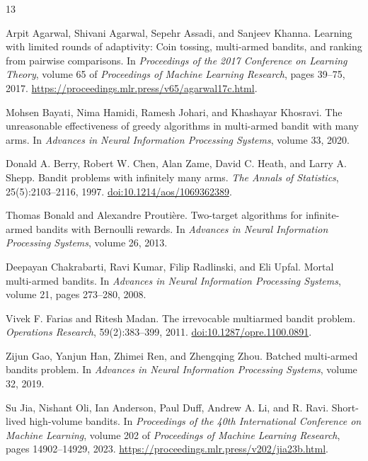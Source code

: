\documentclass[11pt,letterpaper]{article}
\numberwithin{equation}{section}
\theoremstyle{definition}
\theoremstyle{remark}
\newcommand{\1}{\mathbf{1}}
\begin{document}
\begin{thebibliography}{13}

Arpit Agarwal, Shivani Agarwal, Sepehr Assadi, and Sanjeev Khanna.
\newblock Learning with limited rounds of adaptivity: Coin tossing,
multi-armed bandits, and ranking from pairwise comparisons.
\newblock In \emph{Proceedings of the 2017 Conference on Learning Theory},
volume 65 of \emph{Proceedings of Machine Learning Research},
pages 39--75, 2017.
\newblock \url{https://proceedings.mlr.press/v65/agarwal17c.html}.

Mohsen Bayati, Nima Hamidi, Ramesh Johari, and Khashayar Khosravi.
\newblock The unreasonable effectiveness of greedy algorithms in
multi-armed bandit with many arms.
\newblock In \emph{Advances in Neural Information Processing Systems},
volume 33, 2020.

Donald A. Berry, Robert W. Chen, Alan Zame, David C. Heath, and Larry A. Shepp.
\newblock Bandit problems with infinitely many arms.
\newblock \emph{The Annals of Statistics}, 25(5):2103--2116, 1997.
\newblock \href{https://doi.org/10.1214/aos/1069362389}
  {doi:10.1214/aos/1069362389}.

Thomas Bonald and Alexandre Prouti\`ere.
\newblock Two-target algorithms for infinite-armed bandits with Bernoulli rewards.
\newblock In \emph{Advances in Neural Information Processing Systems},
volume 26, 2013.

Deepayan Chakrabarti, Ravi Kumar, Filip Radlinski, and Eli Upfal.
\newblock Mortal multi-armed bandits.
\newblock In \emph{Advances in Neural Information Processing Systems},
volume 21, pages 273--280, 2008.

Vivek F. Farias and Ritesh Madan.
\newblock The irrevocable multiarmed bandit problem.
\newblock \emph{Operations Research}, 59(2):383--399, 2011.
\newblock \href{https://doi.org/10.1287/opre.1100.0891}
  {doi:10.1287/opre.1100.0891}.

Zijun Gao, Yanjun Han, Zhimei Ren, and Zhengqing Zhou.
\newblock Batched multi-armed bandits problem.
\newblock In \emph{Advances in Neural Information Processing Systems},
volume 32, 2019.

Su Jia, Nishant Oli, Ian Anderson, Paul Duff, Andrew A. Li, and R. Ravi.
\newblock Short-lived high-volume bandits.
\newblock In \emph{Proceedings of the 40th International Conference on
Machine Learning}, volume 202 of \emph{Proceedings of Machine Learning
Research}, pages 14902--14929, 2023.
\newblock \url{https://proceedings.mlr.press/v202/jia23b.html}.


\end{thebibliography}
\end{document}
